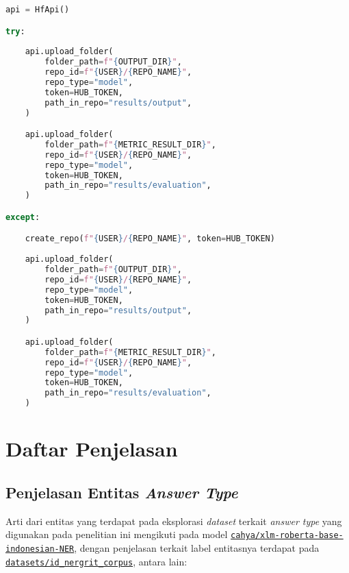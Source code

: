 \begin{lstlisting}[language=Python, caption=Melakukan \emph{push} ke akun Hugging Face]
api = HfApi()

try:
    
    api.upload_folder(
        folder_path=f"{OUTPUT_DIR}",
        repo_id=f"{USER}/{REPO_NAME}",
        repo_type="model",
        token=HUB_TOKEN,
        path_in_repo="results/output",
    )

    api.upload_folder(
        folder_path=f"{METRIC_RESULT_DIR}",
        repo_id=f"{USER}/{REPO_NAME}",
        repo_type="model",
        token=HUB_TOKEN,
        path_in_repo="results/evaluation",
    )

except:

    create_repo(f"{USER}/{REPO_NAME}", token=HUB_TOKEN)
    
    api.upload_folder(
        folder_path=f"{OUTPUT_DIR}",
        repo_id=f"{USER}/{REPO_NAME}",
        repo_type="model",
        token=HUB_TOKEN,
        path_in_repo="results/output",
    )

    api.upload_folder(
        folder_path=f"{METRIC_RESULT_DIR}",
        repo_id=f"{USER}/{REPO_NAME}",
        repo_type="model",
        token=HUB_TOKEN,
        path_in_repo="results/evaluation",
    )
\end{lstlisting}

\chapter*{Daftar Penjelasan}
\label{Lampiran Terkait Penjelasan: 7.2}

\section*{Penjelasan Entitas \emph{Answer Type}}

Arti dari entitas yang terdapat pada eksplorasi \emph{dataset} terkait \emph{answer type} yang digunakan pada penelitian ini mengikuti pada model  \href{https://huggingface.co/cahya/xlm-roberta-base-indonesian-NER}{\texttt{cahya/xlm-roberta-base-indonesian-NER}}, dengan penjelasan terkait label entitasnya terdapat pada \href{https://huggingface.co/datasets/id_nergrit_corpus}{\texttt{datasets/id\_nergrit\_corpus}}, antara lain:

